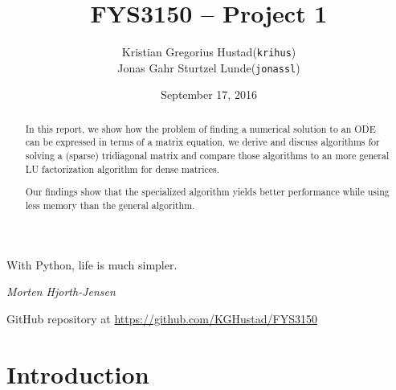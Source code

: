 \documentclass[a4paper]{article}
\begin{document}
\title{FYS3150 -- Project 1}
\author{
    \begin{tabular}{r l}
        Kristian Gregorius Hustad & (\texttt{krihus})\\
        Jonas Gahr Sturtzel Lunde & (\texttt{jonassl})
    \end{tabular}}
\date{September 17, 2016}    %

\maketitle



\setlength{\epigraphwidth}{0.75\textwidth}
\renewcommand{\epigraphflush}{center}
\renewcommand{\beforeepigraphskip}{50pt}
\renewcommand{\afterepigraphskip}{100pt}
\renewcommand{\epigraphsize}{\normalsize}

\epigraph{With Python, life is much simpler.}{\textit{Morten Hjorth-Jensen}}

\begin{abstract}
\noindent
In this report, we show how the problem of finding a numerical solution to an ODE can be expressed in terms of a matrix equation, we derive and discuss algorithms for solving a (sparse) tridiagonal matrix and compare those algorithms to an more general LU factorization algorithm for dense matrices.

\noindent
Our findings show that the specialized algorithm yields better performance while using less memory than the general algorithm.
\end{abstract}

\vfill


\begin{center}
    GitHub repository at \url{https://github.com/KGHustad/FYS3150}
\end{center}

\newpage

\newcommand{\half}{\frac{1}{2}}
\newcommand{\dx}{{\Delta x}}
\newcommand{\bigO}{{\mathcal{O}}}



\section{Introduction}\label{sec:intro}
\end{document}
